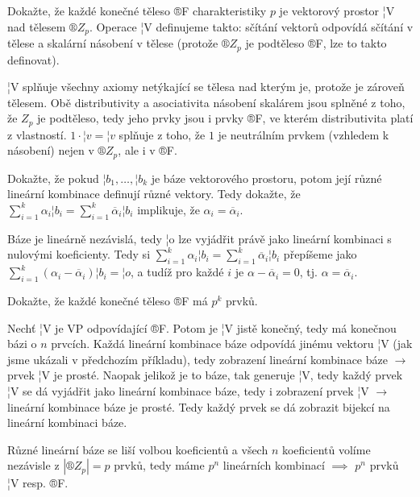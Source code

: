 \documentclass[12pt]{article}					%
\begin{document}
    \begin{priklad}[6.4]
        Dokažte, že každé konečné těleso ®F charakteristiky $p$ je vektorový prostor ¦V nad tělesem $®Z_p$. Operace ¦V definujeme takto: sčítání vektorů odpovídá sčítání v tělese a skalární násobení v tělese (protože $®Z_p$ je podtěleso ®F, lze to takto definovat).

        \begin{dukazin}
            ¦V splňuje všechny axiomy netýkající se tělesa nad kterým je, protože je zároveň tělesem. Obě distributivity a asociativita násobení skalárem jsou splněné z toho, že $Z_p$ je podtěleso, tedy jeho prvky jsou i prvky ®F, ve kterém distributivita platí z vlastností. $1·¦v = ¦v$ splňuje z toho, že $1$ je neutrálním prvkem (vzhledem k násobení) nejen v $®Z_p$, ale i v ®F. 
        \end{dukazin}
    \end{priklad}

    \begin{priklad}[6.5]
        Dokažte, že pokud $¦b_1, …, ¦b_k$ je báze vektorového prostoru, potom její různé lineární kombinace definují různé vektory. Tedy dokažte, že $\sum_{i=1}^k\alpha_i¦b_i = \sum_{i=1}^k\overline{\alpha}_i¦b_i$ implikuje, že $\alpha_i = \overline{\alpha}_i$.

        \begin{dukazin}
                Báze je lineárně nezávislá, tedy ¦o lze vyjádřit právě jako lineární kombinaci s nulovými koeficienty. Tedy si $\sum_{i=1}^k\alpha_i¦b_i = \sum_{i=1}^k\overline{\alpha}_i¦b_i$ přepíšeme jako $\sum_{i=1}^k(\alpha_i - \overline{\alpha}_i)¦b_i = ¦o$, a tudíž pro každé $i$ je $\alpha - \overline{\alpha}_i = 0$, tj. $\alpha = \overline{\alpha}_i$.
        \end{dukazin}
    \end{priklad}

    \begin{priklad}[6.6]
        Dokažte, že každé konečné těleso ®F má $p^k$ prvků.

        \begin{dukazin}
            Nechť ¦V je VP odpovídající ®F. Potom je ¦V jistě konečný, tedy má konečnou bázi o $n$ prvcích. Každá lineární kombinace báze odpovídá jinému vektoru ¦V (jak jsme ukázali v předchozím příkladu), tedy zobrazení lineární kombinace báze $\rightarrow$ prvek ¦V je prosté. Naopak jelikož je to báze, tak generuje ¦V, tedy každý prvek ¦V se dá vyjádřit jako lineární kombinace báze, tedy i zobrazení prvek ¦V $\rightarrow$ lineární kombinace báze je prosté. Tedy každý prvek se dá zobrazit bijekcí na lineární kombinaci báze.

            Různé lineární báze se liší volbou koeficientů a všech $n$ koeficientů volíme nezávisle z $|®Z_p| = p$ prvků, tedy máme $p^n$ lineárních kombinací $\implies$ $p^n$ prvků ¦V resp. ®F.
        \end{dukazin}
    \end{priklad}
\end{document}

